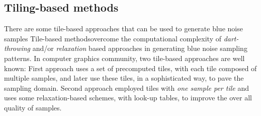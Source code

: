 \subsection{Tiling-based methods}

There are some tile-based approaches that can be used to generate blue noise samples 
Tile-based methodsovercome the computational complexity of  
\emph{dart-throwing} and/or \emph{relaxation} based approaches in generating blue noise sampling patterns. In computer graphics community, two tile-based approaches are well known: First approach uses a set of precomputed tiles, with each tile composed of multiple samples, and later use these tiles, in a sophisticated way, to pave the sampling domain. Second approach employed tiles with \emph{one sample per tile} and uses some relaxation-based schemes, with look-up tables, to improve the over all quality of samples. 
